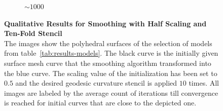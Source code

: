 \documentclass{stdlocal}
\begin{document}
\begin{figure}
\begin{subfigure}[b]{0.24\linewidth}
    \caption{$\sim 1000$}
  \end{subfigure}
  \caption[Qualitative Results for Smoothing with Half Scaling and Ten-Fold Stencil]{%
    \textbf{Qualitative Results for Smoothing with Half Scaling and Ten-Fold Stencil}\\
    The images show the polyhedral surfaces of the selection of models from table~\ref{tab:results-models}.
    The black curve is the initially given surface mesh curve that the smoothing algorithm transformed into the blue curve.
    The scaling value of the initialization has been set to $0.5$ and the desired geodesic curvature stencil is applied $10$ times.
    All images are labeled by the average count of iterations till convergence is reached for initial curves that are close to the depicted one.
  }
  \label{fig:results-half-scaling}
\end{figure}
\end{document}
